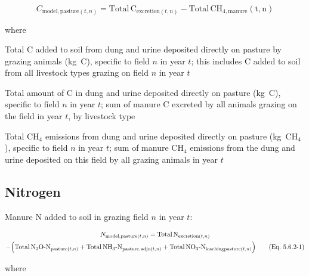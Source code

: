 \begin{equation}
    C_{\mathrm{model,pasture}(t,n)}
        = \mathrm{Total\,C}_{\mathrm{excretion}(t,n)}
          - \mathrm{Total\,CH_{4,\mathrm{manure}}(t,n)}
    \tag{Eq.\ 5.6.1-1}
\end{equation}

\noindent where

\begin{description}[font=\normalfont, leftmargin=12em, style=nextline, nosep]
    \item[$C_{\mathrm{model,pasture}(t,n)}$]
        Total C added to soil from dung and urine deposited directly on pasture
        by grazing animals (kg~C), specific to field $n$ in year $t$; this
        includes C added to soil from all livestock types grazing on field $n$
        in year $t$
    \item[$\mathrm{Total\,C}_{\mathrm{excretion}(t,n)}$]
        Total amount of C in dung and urine deposited directly on pasture
        (kg~C), specific to field $n$ in year $t$; sum of manure C excreted by
        all animals grazing on the field in year $t$, by livestock type
    \item[$\mathrm{Total\,CH_{4,\mathrm{manure}}(t,n)}$]
        Total CH$_4$ emissions from dung and urine deposited directly on pasture
        (kg~CH$_4$), specific to field $n$ in year $t$; sum of manure CH$_4$
        emissions from the dung and urine deposited on this field by all grazing
        animals in year $t$
\end{description}

\subsection{Nitrogen}
\label{subsec:grazing-n-model}

Manure N added to soil in grazing field $n$ in year $t$:

\begin{multline}
    N_{\mathrm{model,pasture}(t,n)}
        = \mathrm{Total\,N}_{\mathrm{excretion}(t,n)} \\
          - \Bigl(
              \mathrm{Total\,N_2O\text{-}N}_{\mathrm{pasture}(t,n)}
              + \mathrm{Total\,NH_3\text{-}N}_{\mathrm{pasture,adju}(t,n)}
              + \mathrm{Total\,NO_3\text{-}N}_{\mathrm{leachingpasture}(t,n)}
            \Bigr)
    \tag{Eq.\ 5.6.2-1}
\end{multline}

\noindent where

